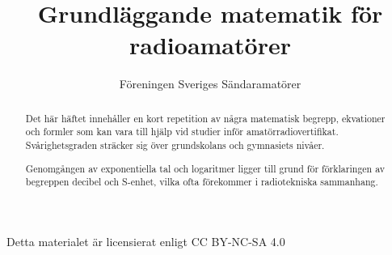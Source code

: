 \documentclass[a4paper]{article}
\begin{document}
\title{Grundläggande matematik för radioamatörer}
\author{Föreningen Sveriges Sändaramatörer}

\maketitle

Detta materialet är licensierat enligt CC BY-NC-SA 4.0

\begin{abstract}
  Det här häftet innehåller en kort repetition av några matematisk begrepp,
  ekvationer och formler som kan vara till hjälp vid studier inför
  amatörradiovertifikat. Svårighetsgraden sträcker sig över grundskolans
  och gymnasiets nivåer.

  Genomgången av exponentiella tal och logaritmer ligger till grund för
  förklaringen av begreppen decibel och S-enhet, vilka ofta förekommer i
  radiotekniska sammanhang.
\end{abstract}


\end{document}
